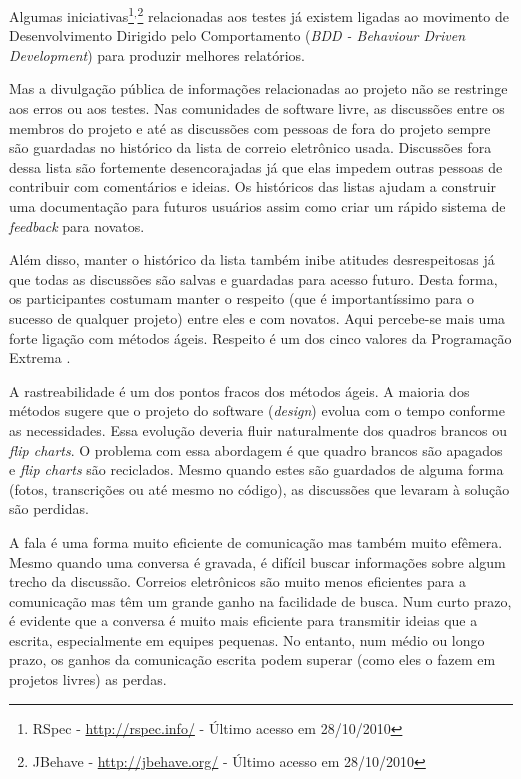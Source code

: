 Algumas iniciativas\footnote{RSpec - \url{http://rspec.info/} - Último
  acesso em 28/10/2010}$^{, }$\footnote{JBehave -
  \url{http://jbehave.org/} - Último acesso em 28/10/2010}
relacionadas aos testes já existem ligadas ao movimento de
Desenvolvimento Dirigido pelo Comportamento (\emph{BDD - Behaviour
  Driven Development}) \cite{North2006} para produzir melhores
relatórios.

Mas a divulgação pública de informações relacionadas ao projeto não se
restringe aos erros ou aos testes. Nas comunidades de software livre,
as discussões entre os membros do projeto e até as discussões com
pessoas de fora do projeto sempre são guardadas no histórico da lista
de correio eletrônico usada. Discussões fora dessa lista são
fortemente desencorajadas já que elas impedem outras pessoas de
contribuir com comentários e ideias. Os históricos das listas ajudam a
construir uma documentação para futuros usuários assim como criar um
rápido sistema de \emph{feedback} para novatos.

Além disso, manter o histórico da lista também inibe atitudes
desrespeitosas já que todas as discussões são salvas e guardadas para
acesso futuro. Desta forma, os participantes costumam manter o
respeito (que é importantíssimo para o sucesso de qualquer projeto)
entre eles e com novatos. Aqui percebe-se mais uma forte ligação com
métodos ágeis. Respeito é um dos cinco valores da Programação Extrema
\cite{XP02}.

A rastreabilidade é um dos pontos fracos dos métodos ágeis. A maioria
dos métodos sugere que o projeto do software (\emph{design}) evolua
com o tempo conforme as necessidades. Essa evolução deveria fluir
naturalmente dos quadros brancos ou \emph{flip charts}. O problema com
essa abordagem é que quadro brancos são apagados e \emph{flip charts}
são reciclados.  Mesmo quando estes são guardados de alguma forma
(fotos, transcrições ou até mesmo no código), as discussões que
levaram à solução são perdidas.

A fala é uma forma muito eficiente de comunicação mas também muito
efêmera. Mesmo quando uma conversa é gravada, é difícil buscar
informações sobre algum trecho da discussão. Correios eletrônicos são
muito menos eficientes para a comunicação mas têm um grande ganho na
facilidade de busca. Num curto prazo, é evidente que a conversa é
muito mais eficiente para transmitir ideias que a escrita,
especialmente em equipes pequenas. No entanto, num médio ou longo
prazo, os ganhos da comunicação escrita podem superar (como eles o
fazem em projetos livres) as perdas.

